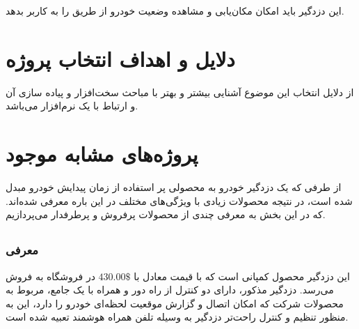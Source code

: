\documentclass[a4paper,12pt]{report}
\begin{document}
	این دزدگیر باید امکان مکان‌یابی و مشاهده وضعیت خودرو از طریق
	را به کاربر بدهد.
	\section{
	دلایل و اهداف انتخاب پروژه
	}\label{sec2:chap1}
		از دلایل انتخاب این موضوع آشنایی بیشتر و بهتر با مباحث سخت‌افزار و پیاده سازی آن و ارتباط با یک نرم‌افزار می‌باشد.

	\section{
	پروژه‌های مشابه موجود
	}\label{sec3:chap1}
	از طرفی که یک دزدگیر خودرو به محصولی پر استفاده از زمان پیدایش خودرو مبدل شده است، در نتیجه محصولات زیادی با ویژگی‌های مختلف در این باره معرفی شده‌اند. که در این بخش به معرفی چندی از محصولات پرفروش و پرطرفدار می‌پردازیم.
	\subsection{
	}\label{subsec1:sec3:chap1}
	\subsubsection{
		معرفی
	}\label{subsubsec1:subsec1:sec3:chap1}
	این دزدگیر محصول کمپانی
	است که با قیمت معادل با
	$430.00\$$
	در فروشگاه
		به فروش می‌رسد.
	دزدگیر مذکور، دارای دو کنترل از راه دور و همراه با یک
	جامع، مربوط به محصولات شرکت
		که امکان اتصال و گزارش موقعیت لحظه‌ای خودرو را دارد، این
	به منظور تنظیم و کنترل راحت‌تر دزدگیر به وسیله تلفن همراه هوشمند تعبیه شده است.
	\cite{ViperCar35:online}
\end{document}
